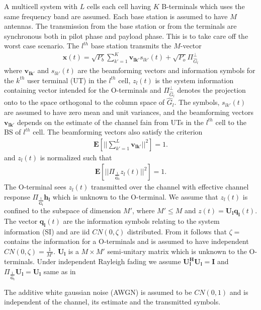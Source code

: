 \documentclass[10pt, a4paper, twoside,fleqn]{article}
\begin{document}
	A multicell system with $L$ cells each cell having $K$ B-terminals which uses the same frequency band are assumed. Each base station is assumed to have $M$ antennas. The transmission from the base station or from the terminals are synchronous both in pilot phase and payload phase. This is to take care off the worst case scenario. The $l^{th}$ base station transmits the $M$-vector
\begin{eqnarray}
	\mathbf{x}(t) = \sqrt{P_b}\sum\limits_{k'=1}^{K}\mathbf{v_{lk'}}s_{lk'}(t)
		      + \sqrt{P_o}\Pi^{\perp}_{{\widehat{G}_l}}
\end{eqnarray}
where $\mathbf{v_{lk'}}$ and $s_{lk'}(t)$ are the beamforming vectors and information symbols for the $k^{th}$ user terminal (UT) in the $l^{th}$ cell, $z_l(t)$ is the system information containing vector intended for the O-terminals and $\Pi^{\perp}_{{\widehat{G}_l}}$ denotes the projection onto to the space orthogonal to the column space of $\hat G_l$. The symbols, $s_{lk'}(t)$ are assumed to have zero mean and unit variances, and the beamforming vectors $\mathbf{v_{lk'}}$ depends on the estimate of the channel fain from UTs in the $l^{th}$ cell to the BS of $l^{th}$ cell. 
The beamforming vectors also satisfy the criterion
\begin{eqnarray}
	\mathbf{E}\left[||\sum\limits_{k'=1}^{L}\mathbf{v_{lk'}}||^2\right]=1.
\end{eqnarray}
and $z_l(t)$ is normalized such that
\begin{eqnarray}\label{eqn:zlcondition}
	\mathbf{E}\left[||\Pi_{\frac{1}{\mathbf{\hat G_l}}}z_l(t)||^2\right]=1.
\end{eqnarray}
The O-terminal sees $z_l(t)$ transmitted over the channel with effective channel response $\Pi_{\frac{1}{\mathbf{\hat G_l}}}\mathbf{h_l}$ which is unknown to the O-terminal. We assume that $z_l(t)$ is confined to the subspace of dimension $M'$, where $M'\leq M$ and $z(t) = \mathbf{U_lq_l}(t)$. The vector $\mathbf{q_l}(t)$ are the information symbols relating to the system information (SI) and are iid $CN(0,\zeta)$ distributed. From \cite{bib:jbb} it follows that $\zeta=$ contains the information for a O-terminals  and is assumed to have independent $CN(0, \zeta)=\frac{1}{M'}$. $\mathbf{U_l}$ is a $M\times M'$ semi-unitary matrix which is unknown to the O-terminals. Under independent Rayleigh fading we assume $\mathbf{U_l^HU_l=I}$ and $\Pi_{\frac{1}{\mathbf{\hat G_l}}}\mathbf{U_l=U_l}$ same as in \cite{bib:jbb}

The additive white gaussian noise (AWGN) is assumed to be $CN(0,1)$ and is independent of the channel, its estimate and the transmitted symbols.
\end{document}
